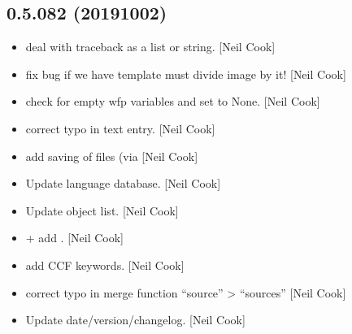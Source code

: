 \documentclass[a4paper,10pt,english]{report}
\begin{document}
\subsection{0.5.082 (2019\sphinxhyphen{}10\sphinxhyphen{}02)}
\label{\detokenize{misc/changelog:id80}}\begin{itemize}
\item {} 
 \sphinxhyphen{} deal with traceback as a list or
string. {[}Neil Cook{]}

\item {} 
 \sphinxhyphen{} fix bug if we have template must divide
image by it! {[}Neil Cook{]}

\item {} 
 \sphinxhyphen{} check for empty wfp variables and set to None.
{[}Neil Cook{]}

\item {} 
 \sphinxhyphen{} correct typo in text entry.
{[}Neil Cook{]}

\item {} 
 \sphinxhyphen{} add saving of files (via 
{[}Neil Cook{]}

\item {} 
Update language database. {[}Neil Cook{]}

\item {} 
Update object list. {[}Neil Cook{]}

\item {} 
 +  \sphinxhyphen{}
add . {[}Neil Cook{]}

\item {} 
 \sphinxhyphen{} add CCF keywords. {[}Neil Cook{]}

\item {} 
 \sphinxhyphen{} correct typo in merge function
“source” \textendash{}\textgreater{} “sources” {[}Neil Cook{]}

\item {} 
Update date/version/changelog. {[}Neil Cook{]}

\end{itemize}
\end{document}
